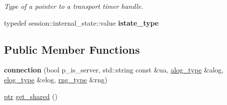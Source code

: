 \begin{DoxyCompactItemize}
\begin{DoxyCompactList}\small\item\em Type of a pointer to a transport timer handle. \end{DoxyCompactList}\item 
typedef session\+::internal\+\_\+state\+::value {\bfseries istate\+\_\+type}\hypertarget{classwebsocketpp_1_1connection_ab22544fdc49d7f332cd1abba9fefd814}{}\label{classwebsocketpp_1_1connection_ab22544fdc49d7f332cd1abba9fefd814}

\end{DoxyCompactItemize}
\subsection*{Public Member Functions}
\begin{DoxyCompactItemize}
\item 
{\bfseries connection} (bool p\+\_\+is\+\_\+server, std\+::string const \&ua, \hyperlink{classwebsocketpp_1_1connection_a2da7d18aecf9153429bab9fcd2bab7b8}{alog\+\_\+type} \&alog, \hyperlink{classwebsocketpp_1_1connection_a80314ab2e4ddefdd4783fb1934fedee6}{elog\+\_\+type} \&elog, \hyperlink{classwebsocketpp_1_1connection_afc276f2f61d5b1acfadc64f91b3f89e5}{rng\+\_\+type} \&rng)\hypertarget{classwebsocketpp_1_1connection_a525947d8d33ee1e410d02706246ffe94}{}\label{classwebsocketpp_1_1connection_a525947d8d33ee1e410d02706246ffe94}

\item 
\hyperlink{classwebsocketpp_1_1connection_ab910d42e3bde91546183cc54642f32ab}{ptr} \hyperlink{classwebsocketpp_1_1connection_a01a5af7dc2f35ff8f15da8c2cf3a3b02}{get\+\_\+shared} ()\hypertarget{classwebsocketpp_1_1connection_a01a5af7dc2f35ff8f15da8c2cf3a3b02}{}\label{classwebsocketpp_1_1connection_a01a5af7dc2f35ff8f15da8c2cf3a3b02}


\end{DoxyCompactItemize}
